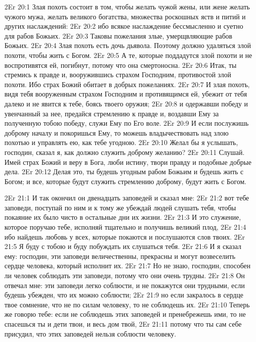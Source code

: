 \vs 2Er 20:1
Злая похоть состоит в том,
чтобы желать чужой жены, или жене желать чужого мужа, желать великого
богатства, множества роскошных яств и питий и других наслаждений:
\vs 2Er 20:2
ибо всякое наслаждение
бессмысленно и суетно для рабов Божьих.
\vs 2Er 20:3
Таковы пожелания злые,
умерщвляющие рабов Божьих.
\vs 2Er 20:4
Злая похоть есть дочь
дьявола. Поэтому должно удаляться злой похоти, чтобы жить с Богом.
\vs 2Er 20:5
А те, которые поддадутся
злой похоти и не воспротивятся ей, погибнут, потому что она смертоносна.
\vs 2Er 20:6
Итак, ты стремись к правде
и, вооружившись страхом Господним, противостой злой похоти. Ибо страх Божий
обитает в добрых пожеланиях.
\vs 2Er 20:7
И злая похоть, видя тебя
вооруженным страхом Господним и противящимся ей, убежит от тебя далеко и не
явится к тебе, боясь твоего оружия;
\vs 2Er 20:8
и одержавши победу и
увенчанный за нее, предайся стремлению к правде и, воздавши Ему за полученную
тобою победу, служи Ему по Его воле.
\vs 2Er 20:9
И если послужишь доброму
началу и покоришься Ему, то можешь владычествовать над злою похотью и
управлять ею, как тебе угодною.
\vs 2Er 20:10
Желал бы я услышать,
господин, сказал я, как должно служить доброму желанию?
\vs 2Er 20:11
Слушай. Имей страх Божий
и веру в Бога, люби истину, твори правду и подобные добрые дела.
\vs 2Er 20:12
Делая это, ты будешь
угодным рабом Божьим и будешь жить с Богом; и все, которые будут служить
стремлению доброму, будут жить с Богом.

\vs 2Er 21:1
И так окончил он
двенадцать заповедей и сказал мне:
\vs 2Er 21:2
вот тебе заповеди,
поступай по ним и к тому же убеждай людей слушать тебя, чтобы покаяние их было
чисто в остальные дни их жизни.
\vs 2Er 21:3
И это служение, которое
поручаю тебе, исполняй тщательно и получишь великий плод,
\vs 2Er 21:4
ибо найдешь любовь у всех,
которые покаются и послушаются слов твоих.
\vs 2Er 21:5
Я буду с тобою и буду
побуждать их слушаться тебя.
\vs 2Er 21:6
И я сказал ему: господин,
эти заповеди величественны, прекрасны и могут возвеселить сердце человека,
который исполнит их.
\vs 2Er 21:7
Но не знаю, господин,
способен ли человек соблюдать эти заповеди, потому что они очень трудны.
\vs 2Er 21:8
Он отвечал мне: эти
заповеди легко соблюсти, и не покажутся они трудными, если будешь убежден, что
их можно соблюсти;
\vs 2Er 21:9
но если закралось в сердце
твое сомнение, что не по силам человеку, то не соблюдешь их.
\vs 2Er 21:10
Теперь же говорю тебе:
если не соблюдешь этих заповедей и пренебрежешь ими, то не спасешься ты и дети
твои, и весь дом твой,
\vs 2Er 21:11
потому что ты сам себе
присудил, что этих заповедей нельзя соблюсти человеку.

